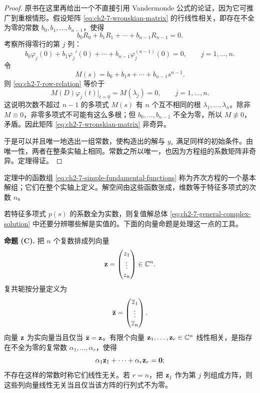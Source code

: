 \begin{proof}
原书在这里再给出一个不直接引用 Vandermonde 公式的论证，因为它可推广到重根情形。假设矩阵 \eqref{eq:ch2-7-wronskian-matrix} 的行线性相关，即存在不全为零的常数 \(b_0,b_1,\ldots,b_{n-1}\)，使得
\[
 b_0R_0+b_1R_1+\cdots+b_{n-1}R_{n-1}=0.
\]
考察所得零行的第 \(j\) 列：
\begin{equation}
 b_0\varphi_j(0)+b_1\varphi_j'(0)+\cdots+b_{n-1}\varphi_j^{(n-1)}(0)=0,
 \qquad j=1,\ldots,n.
 \label{eq:ch2-7-row-relation}
\end{equation}
令
\[
 M(s)=b_0+b_1s+\cdots+b_{n-1}s^{n-1}.
\]
则 \eqref{eq:ch2-7-row-relation} 等价于
\[
 M(D)\varphi_j(t)\big|_{t=0}=M(\lambda_j)=0,
 \qquad j=1,\ldots,n.
\]
这说明次数不超过 \(n-1\) 的多项式 \(M(s)\) 有 \(n\) 个互不相同的根 \(\lambda_1,\ldots,\lambda_n\)。除非 \(M\equiv0\)，非零多项式不可能有这么多根；但 \(b_0,\ldots,b_{n-1}\) 不全为零，所以 \(M\not\equiv0\)，矛盾。因此矩阵 \eqref{eq:ch2-7-wronskian-matrix} 非奇异。

于是可以并且唯一地选出一组常数，使构造出的解与 \(y_*\) 满足同样的初始条件。由唯一性，两者在整条实轴上相同。常数之所以唯一，也因为方程组的系数矩阵非奇异。定理得证。
\end{proof}

定理中的函数组 \eqref{eq:ch2-7-simple-fundamental-functions} 称为齐次方程的一个基本解组；它们在整个实轴上定义。解空间由这些函数张成，维数等于特征多项式的次数 \(n\)。

若特征多项式 \(p(s)\) 的系数全为实数，则复值解总体 \eqref{eq:ch2-7-general-complex-solution} 中还要分辨哪些解是实值的。下面的向量命题是处理这一点的工具。

\medskip
\noindent\textbf{命题 (C).}
把 \(n\) 个复数排成列向量
\[
 \vect{z}=
 \begin{pmatrix}
  z_1\\ \vdots\\ z_n
 \end{pmatrix}\in\C^n.
\]
复共轭按分量定义为
\[
 \overline{\vect{z}}=
 \begin{pmatrix}
  \overline z_1\\ \vdots\\ \overline z_n
 \end{pmatrix}.
\]
向量 \(\vect{z}\) 为实向量当且仅当 \(\overline{\vect{z}}=\vect{z}\)。有限个向量 \(\vect{z}_1,\ldots,\vect{z}_r\in\C^n\) 线性相关，是指存在不全为零的复常数 \(\alpha_1,\ldots,\alpha_r\)，使得
\[
 \alpha_1\vect{z}_1+\cdots+\alpha_r\vect{z}_r=\vect{0};
\]
不存在这样的常数时称它们线性无关。若 \(r=n\)，把 \(\vect{z}_j\) 作为第 \(j\) 列组成方阵，则这些列向量线性无关当且仅当该方阵的行列式不为零。

